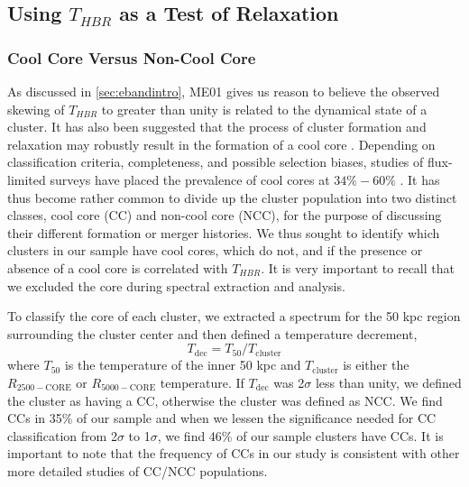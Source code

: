 \subsection{Using $T_{HBR}$ as a Test of Relaxation}
\label{sec:ebandrelax}

\subsubsection{Cool Core Versus Non-Cool Core}
\label{sec:ebandccncc}

As discussed in \ref{sec:ebandintro}, ME01 gives us reason to believe the
observed skewing of $T_{HBR}$ to greater than unity is related to the
dynamical state of a cluster. It has also been suggested that the
process of cluster formation and relaxation may robustly result in the
formation of a cool core \citep{2006ApJ...640..673O,
  2008ApJ...675.1125B}. Depending on classification criteria,
completeness, and possible selection biases, studies of flux-limited
surveys have placed the prevalence of cool cores at $34\%-60\%$
\citep{white97, 1998MNRAS.298..416P, 2005MNRAS.359.1481B,
  2007A&A...466..805C}. It has thus become rather common to divide up
the cluster population into two distinct classes, cool core (CC) and
non-cool core (NCC), for the purpose of discussing their different
formation or merger histories. We thus sought to identify which
clusters in our sample have cool cores, which do not, and if the
presence or absence of a cool core is correlated with $T_{HBR}$. It is
very important to recall that we excluded the core during spectral
extraction and analysis.

To classify the core of each cluster, we extracted a spectrum for the
50 kpc region surrounding the cluster center and then defined a
temperature decrement,
\begin{equation}
T_{\mathrm{dec}} = T_{50}/T_{\mathrm{cluster}}
\label{eqn:tdec}
\end{equation}
where $T_{50}$ is the temperature of the inner 50 kpc and
$T_{\mathrm{cluster}}$ is either the $R_{2500-\mathrm{CORE}}$ or
$R_{5000-\mathrm{CORE}}$ temperature. If $T_{\mathrm{dec}}$ was
2$\sigma$ less than unity, we defined the cluster as having a CC,
otherwise the cluster was defined as NCC. We find CCs in 35\% of our
sample and when we lessen the significance needed for CC
classification from 2$\sigma$ to 1$\sigma$, we find 46\% of our sample
clusters have CCs. It is important to note that the frequency of CCs
in our study is consistent with other more detailed studies of CC/NCC
populations.

